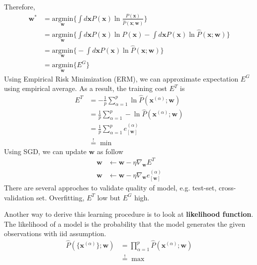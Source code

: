 Therefore, 
\begin{align*}
	\boldsymbol{w}^* &= \underset{\boldsymbol{w}}{\text{argmin}} \bigg \{  \int d\boldsymbol{x} P( \boldsymbol{x}  ) \ln \frac{P( \boldsymbol{x}  )}{ \hat{P} ( \boldsymbol{x}; \boldsymbol{w} )   }   \bigg \}\\
	&= \underset{\boldsymbol{w}}{\text{argmin}} \bigg \{  \int d\boldsymbol{x} P( \boldsymbol{x}  ) \ln P( \boldsymbol{x}  ) - \int d\boldsymbol{x} P( \boldsymbol{x}  ) \ln \hat{P} ( \boldsymbol{x}; \boldsymbol{w} )  \bigg \}\\
		&= \underset{\boldsymbol{w}}{\text{argmin}} \bigg \{  - \int d\boldsymbol{x} P( \boldsymbol{x}  ) \ln \hat{P} ( \boldsymbol{x}; \boldsymbol{w} )  \bigg \}\\
		&= \underset{\boldsymbol{w}}{\text{argmin}} \bigg \{ E^G \bigg \}
\end{align*}
Using Empirical Risk Minimization (ERM), we can approximate expectation $E^G$ using empirical average. As a result, the training cost $E^T$ is
\begin{align*}
	E^T &= -\frac{1}{p} \sum_{\alpha =1 }^{p} \ln \hat{P} ( \boldsymbol{x}^{(\alpha)}; \boldsymbol{w} )  \\
	&= \frac{1}{p} \sum_{\alpha =1 }^{p} -\ln \hat{P} ( \boldsymbol{x}^{(\alpha)}; \boldsymbol{w} )\\
	&= \frac{1}{p} \sum_{\alpha =1 }^{p} e^{(\alpha)}_{[\boldsymbol{w}]}\\
	&\stackrel{!}{=} \min
\end{align*}
Using SGD, we can update $\boldsymbol{w}$ as follow
\begin{align*}
	\boldsymbol{w} &\leftarrow \boldsymbol{w} - \eta \nabla_{\boldsymbol{w}} E^T \tag*{(batch-learning)}\\
		\boldsymbol{w} &\leftarrow \boldsymbol{w} - \eta \nabla_{\boldsymbol{w}} e^{(\alpha)}_{[\boldsymbol{w}]}  \tag*{(online-learning)}
\end{align*}
There are several approches to validate quality of model, e.g. test-set, cross-validation set.
Overfitting, $E^T$ low but $E^G$ high.

Another way to derive this learning procedure is to look at \textbf{likelihood function}. The likelihood of a model is the probability that the model generates the given observations with iid assumption.
\begin{align*}
	\hat{P}( \{ \boldsymbol{x}^{(\alpha)} \}; \boldsymbol{w} ) &= \prod_{\alpha=1}^{p} 	\hat{P}( \boldsymbol{x}^{(\alpha)} ; \boldsymbol{w} ) \\
	&\stackrel{!}{=} \max
\end{align*}

